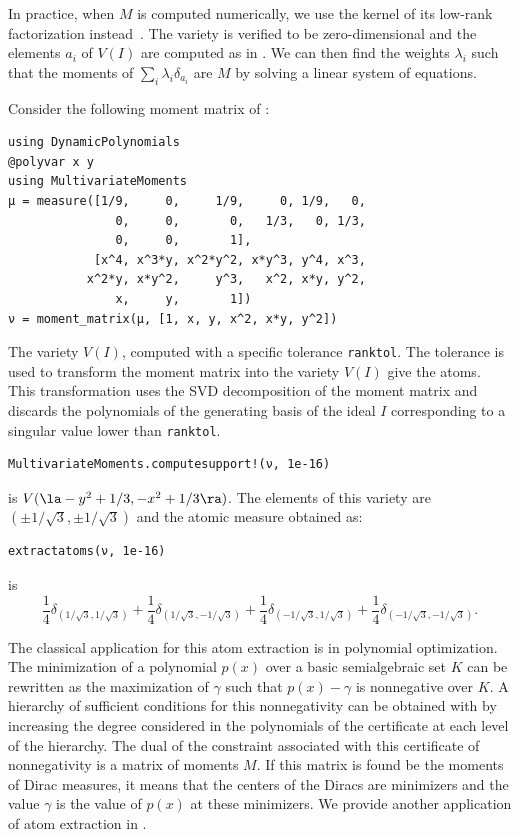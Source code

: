 \documentclass[11pt,twoside,a4paper,openright]{uclouvain-thesis}
\begin{document}
In practice, when $M$ is computed numerically, we use the kernel of its low-rank factorization instead~\cite{henrion2005detecting}.
The variety is verified to be zero-dimensional and the elements $a_i$ of $V(I)$ are computed as in .
We can then find the weights $\lambda_i$ such that the moments of $\sum_i \lambda_i \delta_{a_i}$ are $M$ by solving a linear system of equations.

\begin{myexem}
  \label{exem:moment}
  Consider the following moment matrix of \cite[Section~4]{henrion2005detecting}:
\begin{verbatim}
using DynamicPolynomials
@polyvar x y
using MultivariateMoments
μ = measure([1/9,     0,     1/9,     0, 1/9,   0,
               0,     0,       0,   1/3,   0, 1/3,
               0,     0,       1],
            [x^4, x^3*y, x^2*y^2, x*y^3, y^4, x^3,
           x^2*y, x*y^2,     y^3,   x^2, x*y, y^2,
               x,     y,       1])
ν = moment_matrix(μ, [1, x, y, x^2, x*y, y^2])
\end{verbatim}
  The variety $V(I)$, computed with a specific tolerance \texttt{ranktol}.
  The tolerance is used to transform the moment matrix into the variety $V(I)$ give the atoms.
  This transformation uses the SVD decomposition of the moment matrix and discards the polynomials of the generating basis of the ideal $I$ corresponding to a singular value lower than \texttt{ranktol}.
\begin{verbatim}
MultivariateMoments.computesupport!(ν, 1e-16)
\end{verbatim}
  is $V(\la -y^2 + 1/3, -x^2 + 1/3 \ra)$.
  The elements of this variety are $(\pm 1/\sqrt{3}, \pm 1/\sqrt{3})$
  and the atomic measure obtained as:
\begin{verbatim}
extractatoms(ν, 1e-16)
\end{verbatim}
  is
  \[
    \frac 14 \delta_{( 1/\sqrt{3},  1/\sqrt{3})} +
    \frac 14 \delta_{( 1/\sqrt{3}, -1/\sqrt{3})} +
    \frac 14 \delta_{(-1/\sqrt{3},  1/\sqrt{3})} +
    \frac 14 \delta_{(-1/\sqrt{3}, -1/\sqrt{3})}.
  \]
\end{myexem}

The classical application for this atom extraction is in polynomial optimization.
The minimization of a polynomial $p(x)$ over a basic semialgebraic
set $K$ can be rewritten as the maximization of $\gamma$
such that $p(x) - \gamma$ is nonnegative over $K$.
A hierarchy of sufficient conditions for this nonnegativity can be obtained with
 by increasing the degree considered in the polynomials of the certificate at each level of the hierarchy.
The dual of the constraint associated with this certificate of nonnegativity
is a matrix of moments $M$.
If this matrix is found be the moments of Dirac measures, it means that
the centers of the Diracs are minimizers and the value $\gamma$ is the
value of $p(x)$ at these minimizers.
We provide another application of atom extraction in .
\end{document}

